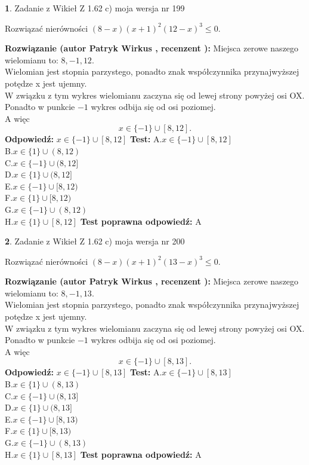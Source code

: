 \documentclass[12pt, a4paper]{article}
\theoremstyle{definition} %
\newtheorem{zad}{}
\newcommand{\zadStart}[1]{\begin{zad}#1\newline}
\newcommand{\zadStop}{\end{zad}}
\newcommand{\rozwStart}[2]{\noindent \textbf{Rozwiązanie (autor #1 , recenzent #2): }\newline}
\newcommand{\rozwStop}{\newline}
\newcommand{\odpStart}{\noindent \textbf{Odpowiedź:}\newline}
\newcommand{\odpStop}{\newline}
\newcommand{\testStart}{\noindent \textbf{Test:}\newline}
\newcommand{\testStop}{\newline}
\newcommand{\kluczStart}{\noindent \textbf{Test poprawna odpowiedź:}\newline}
\newcommand{\kluczStop}{\newline}
\begin{document}
\zadStart{Zadanie z Wikieł Z 1.62 c) moja wersja nr 199}

Rozwiązać nierówności $(8-x)(x+1)^{2}(12-x)^{3}\le0$.
\zadStop
\rozwStart{Patryk Wirkus}{}
Miejsca zerowe naszego wielomianu to: $8, -1, 12$.\\
Wielomian jest stopnia parzystego, ponadto znak współczynnika przy\linebreak najwyższej potędze x jest ujemny.\\ W związku z tym wykres wielomianu zaczyna się od lewej strony powyżej osi OX.\\
Ponadto w punkcie $-1$ wykres odbija się od osi poziomej.\\
A więc $$x \in \{-1\} \cup [8,12].$$
\rozwStop
\odpStart
$x \in \{-1\} \cup [8,12]$
\odpStop
\testStart
A.$x \in \{-1\} \cup [8,12]$\\
B.$x \in \{1\} \cup (8,12)$\\
C.$x \in \{-1\} \cup (8,12]$\\
D.$x \in \{1\} \cup (8,12]$\\
E.$x \in \{-1\} \cup [8,12)$\\
F.$x \in \{1\} \cup [8,12)$\\
G.$x \in \{-1\} \cup (8,12)$\\
H.$x \in \{1\} \cup [8,12]$
\testStop
\kluczStart
A
\kluczStop



\zadStart{Zadanie z Wikieł Z 1.62 c) moja wersja nr 200}

Rozwiązać nierówności $(8-x)(x+1)^{2}(13-x)^{3}\le0$.
\zadStop
\rozwStart{Patryk Wirkus}{}
Miejsca zerowe naszego wielomianu to: $8, -1, 13$.\\
Wielomian jest stopnia parzystego, ponadto znak współczynnika przy\linebreak najwyższej potędze x jest ujemny.\\ W związku z tym wykres wielomianu zaczyna się od lewej strony powyżej osi OX.\\
Ponadto w punkcie $-1$ wykres odbija się od osi poziomej.\\
A więc $$x \in \{-1\} \cup [8,13].$$
\rozwStop
\odpStart
$x \in \{-1\} \cup [8,13]$
\odpStop
\testStart
A.$x \in \{-1\} \cup [8,13]$\\
B.$x \in \{1\} \cup (8,13)$\\
C.$x \in \{-1\} \cup (8,13]$\\
D.$x \in \{1\} \cup (8,13]$\\
E.$x \in \{-1\} \cup [8,13)$\\
F.$x \in \{1\} \cup [8,13)$\\
G.$x \in \{-1\} \cup (8,13)$\\
H.$x \in \{1\} \cup [8,13]$
\testStop
\kluczStart
A
\kluczStop
\end{document}
